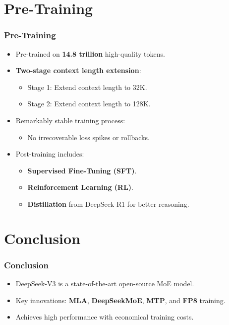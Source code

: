 \documentclass{beamer}
\begin{document}
\section{Pre-Training}

\begin{frame}
    \frametitle{Pre-Training}
    \begin{itemize}
        \item Pre-trained on \textbf{14.8 trillion} high-quality tokens.
        \item \textbf{Two-stage context length extension}:
              \begin{itemize}
                  \item Stage 1: Extend context length to 32K.
                  \item Stage 2: Extend context length to 128K.
              \end{itemize}
        \item Remarkably stable training process:
              \begin{itemize}
                  \item No irrecoverable loss spikes or rollbacks.
              \end{itemize}
        \item Post-training includes:
              \begin{itemize}
                  \item \textbf{Supervised Fine-Tuning (SFT)}.
                  \item \textbf{Reinforcement Learning (RL)}.
                  \item \textbf{Distillation} from DeepSeek-R1 for better reasoning.
              \end{itemize}
    \end{itemize}
\end{frame}

\section{Conclusion}

\begin{frame}
    \frametitle{Conclusion}
    \begin{itemize}
        \item DeepSeek-V3 is a state-of-the-art open-source MoE model.
        \item Key innovations: \textbf{MLA}, \textbf{DeepSeekMoE}, \textbf{MTP}, and \textbf{FP8} training.
        \item Achieves high performance with economical training costs.
    \end{itemize}
\end{frame}
\end{document}
